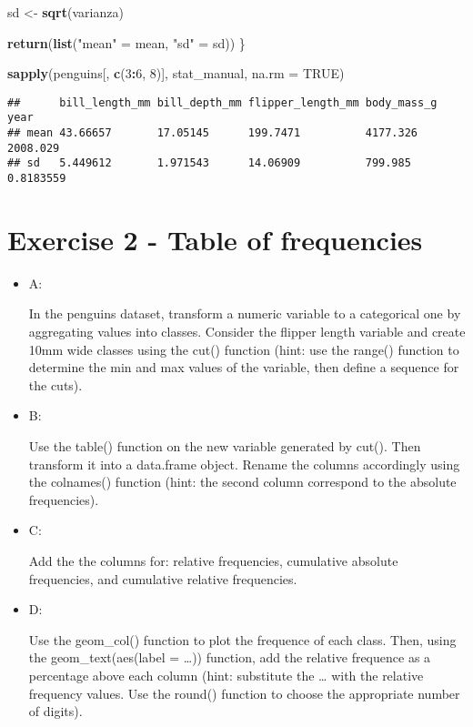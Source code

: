 \documentclass[
]{article}
\newenvironment{Shaded}{\begin{snugshade}}{\end{snugshade}}
\newcommand{\AttributeTok}[1]{\textcolor[rgb]{0.13,0.29,0.53}{#1}}
\newcommand{\ConstantTok}[1]{\textcolor[rgb]{0.56,0.35,0.01}{#1}}
\newcommand{\DecValTok}[1]{\textcolor[rgb]{0.00,0.00,0.81}{#1}}
\newcommand{\FunctionTok}[1]{\textcolor[rgb]{0.13,0.29,0.53}{\textbf{#1}}}
\newcommand{\NormalTok}[1]{#1}
\newcommand{\OtherTok}[1]{\textcolor[rgb]{0.56,0.35,0.01}{#1}}
\newcommand{\SpecialCharTok}[1]{\textcolor[rgb]{0.81,0.36,0.00}{\textbf{#1}}}
\newcommand{\StringTok}[1]{\textcolor[rgb]{0.31,0.60,0.02}{#1}}
\begin{document}
\begin{Shaded}
\begin{Highlighting}[]
\NormalTok{  sd }\OtherTok{\textless{}{-}} \FunctionTok{sqrt}\NormalTok{(varianza)}

  \FunctionTok{return}\NormalTok{(}\FunctionTok{list}\NormalTok{(}\StringTok{"mean"} \OtherTok{=}\NormalTok{ mean, }\StringTok{"sd"} \OtherTok{=}\NormalTok{ sd))}
\NormalTok{\}}

\FunctionTok{sapply}\NormalTok{(penguins[, }\FunctionTok{c}\NormalTok{(}\DecValTok{3}\SpecialCharTok{:}\DecValTok{6}\NormalTok{, }\DecValTok{8}\NormalTok{)], stat\_manual, }\AttributeTok{na.rm =} \ConstantTok{TRUE}\NormalTok{)}
\end{Highlighting}
\end{Shaded}

\begin{verbatim}
##      bill_length_mm bill_depth_mm flipper_length_mm body_mass_g year     
## mean 43.66657       17.05145      199.7471          4177.326    2008.029 
## sd   5.449612       1.971543      14.06909          799.985     0.8183559
\end{verbatim}

\hypertarget{exercise-2---table-of-frequencies}{%
\section{Exercise 2 - Table of
frequencies}\label{exercise-2---table-of-frequencies}}

\begin{itemize}
\item
  A:

  In the penguins dataset, transform a numeric variable to a categorical
  one by aggregating values into classes. Consider the flipper length
  variable and create 10mm wide classes using the cut() function (hint:
  use the range() function to determine the min and max values of the
  variable, then define a sequence for the cuts).
\item
  B:

  Use the table() function on the new variable generated by cut(). Then
  transform it into a data.frame object. Rename the columns accordingly
  using the colnames() function (hint: the second column correspond to
  the absolute frequencies).
\item
  C:

  Add the the columns for: relative frequencies, cumulative absolute
  frequencies, and cumulative relative frequencies.
\item
  D:

  Use the geom\_col() function to plot the frequence of each class.
  Then, using the geom\_text(aes(label = \ldots)) function, add the
  relative frequence as a percentage above each column (hint: substitute
  the \ldots{} with the relative frequency values. Use the round()
  function to choose the appropriate number of digits).
\end{itemize}
\end{document}
